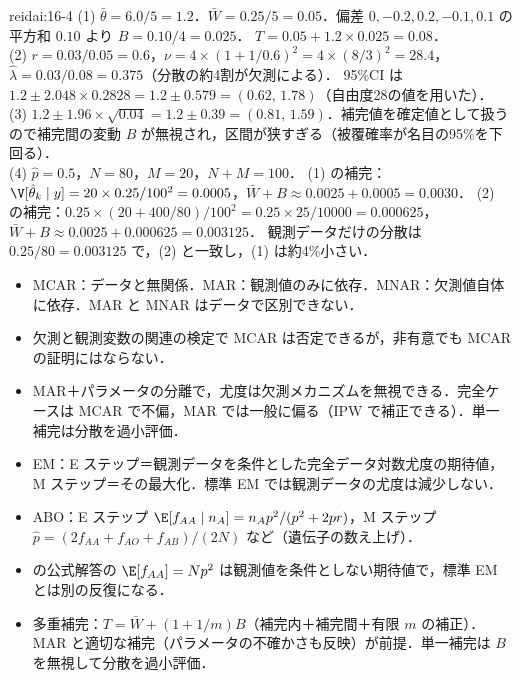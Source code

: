 \begin{kaitou}{reidai:16-4}
(1) $\bar\theta=6.0/5=1.2$．$\bar W=0.25/5=0.05$．偏差 $0,-0.2,0.2,-0.1,0.1$ の平方和 $0.10$ より $B=0.10/4=0.025$．
$T=0.05+1.2\times0.025=0.08$．\\
(2) $r=0.03/0.05=0.6$，$\nu=4\times(1+1/0.6)^2=4\times(8/3)^2=28.4$，$\hat\lambda=0.03/0.08=0.375$（分散の約4割が欠測による）．
95\%CI は $1.2\pm2.048\times0.2828=1.2\pm0.579=(0.62,\,1.78)$（自由度28の値を用いた）．\\
(3) $1.2\pm1.96\times\sqrt{0.04}=1.2\pm0.39=(0.81,\,1.59)$．補完値を確定値として扱うので補完間の変動 $B$ が無視され，区間が狭すぎる（被覆確率が名目の95\%を下回る）．\\
(4) $\hat p=0.5$，$N=80$，$M=20$，$N+M=100$．
(1) の補完：$\V[\hat\theta_k\mid y]=20\times0.25/100^2=0.0005$，$\bar W+B\approx0.0025+0.0005=0.0030$．
(2) の補完：$0.25\times(20+400/80)/100^2=0.25\times25/10000=0.000625$，$\bar W+B\approx0.0025+0.000625=0.003125$．
観測データだけの分散は $0.25/80=0.003125$ で，(2) と一致し，(1) は約4\%小さい．
\end{kaitou}

\begin{summarybox}
\begin{itemize}
\item MCAR：データと無関係．MAR：観測値のみに依存．MNAR：欠測値自体に依存．MAR と MNAR はデータで区別できない．
\item 欠測と観測変数の関連の検定で MCAR は否定できるが，非有意でも MCAR の証明にはならない．
\item MAR＋パラメータの分離で，尤度は欠測メカニズムを無視できる．完全ケースは MCAR で不偏，MAR では一般に偏る（IPW で補正できる）．単一補完は分散を過小評価．
\item EM：E ステップ＝観測データを条件とした完全データ対数尤度の期待値，M ステップ＝その最大化．標準 EM では観測データの尤度は減少しない．
\item ABO：E ステップ $\E[f_{AA}\mid n_A]=n_Ap^2/(p^2+2pr)$，M ステップ $\hat p=(2f_{AA}+f_{AO}+f_{AB})/(2N)$ など（遺伝子の数え上げ）．
\item {} の公式解答の $\E[f_{AA}]=Np^2$ は観測値を条件としない期待値で，標準 EM とは別の反復になる．
\item 多重補完：$T=\bar W+(1+1/m)B$（補完内＋補完間＋有限 $m$ の補正）．MAR と適切な補完（パラメータの不確かさも反映）が前提．単一補完は $B$ を無視して分散を過小評価．
\end{itemize}
\end{summarybox}
